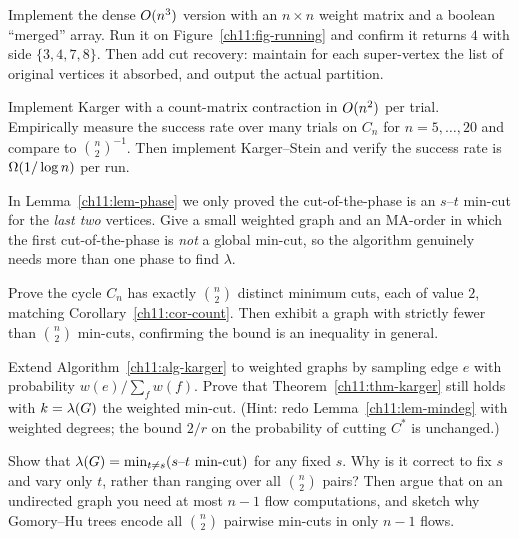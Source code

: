\begin{exercise}\label{ch11:ex-implsw}
Implement the dense $O(n^3)$ version with an $n\times n$ weight matrix and a boolean ``merged'' array. Run it on Figure~\ref{ch11:fig-running} and confirm it returns $4$ with side $\{3,4,7,8\}$. Then add cut recovery: maintain for each super-vertex the list of original vertices it absorbed, and output the actual partition.
\end{exercise}

\begin{exercise}\label{ch11:ex-implkarger}
Implement Karger with a count-matrix contraction in $O(n^2)$ per trial. Empirically measure the success rate over many trials on $C_n$ for $n=5,\dots,20$ and compare to $\binom n2^{-1}$. Then implement Karger--Stein and verify the success rate is $\Omega(1/\log n)$ per run.
\end{exercise}

\begin{exercise}\label{ch11:ex-tight}
In Lemma~\ref{ch11:lem-phase} we only proved the cut-of-the-phase is an $s$--$t$ min-cut for the \emph{last two} vertices. Give a small weighted graph and an MA-order in which the first cut-of-the-phase is \emph{not} a global min-cut, so the algorithm genuinely needs more than one phase to find $\lambda$.
\end{exercise}

\begin{exercise}\label{ch11:ex-cycle}
Prove the cycle $C_n$ has exactly $\binom n2$ distinct minimum cuts, each of value $2$, matching Corollary~\ref{ch11:cor-count}. Then exhibit a graph with strictly fewer than $\binom n2$ min-cuts, confirming the bound is an inequality in general.
\end{exercise}

\begin{exercise}\label{ch11:ex-weighted}
Extend Algorithm~\ref{ch11:alg-karger} to weighted graphs by sampling edge $e$ with probability $w(e)/\sum_f w(f)$. Prove that Theorem~\ref{ch11:thm-karger} still holds with $k=\lambda(G)$ the weighted min-cut. (Hint: redo Lemma~\ref{ch11:lem-mindeg} with weighted degrees; the bound $2/r$ on the probability of cutting $C^\ast$ is unchanged.)
\end{exercise}

\begin{exercise}\label{ch11:ex-flow}
Show that $\lambda(G)=\min_{t\neq s}(\text{$s$--$t$ min-cut})$ for any fixed $s$. Why is it correct to fix $s$ and vary only $t$, rather than ranging over all $\binom n2$ pairs? Then argue that on an undirected graph you need at most $n-1$ flow computations, and sketch why Gomory--Hu trees encode all $\binom n2$ pairwise min-cuts in only $n-1$ flows.
\end{exercise}

